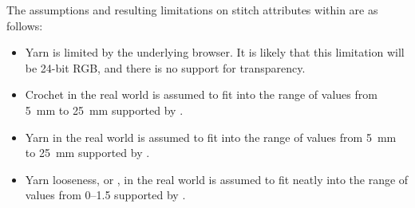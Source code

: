 \documentclass[main.tex]{subfiles}
\begin{document}
The assumptions and resulting limitations on stitch attributes within \CC{} are as follows:

\begin{itemize}
\item Yarn  is limited by the underlying browser. It is likely that this limitation will be 24-bit RGB, and there is no support for transparency.
\item Crochet  in the real world is assumed to fit into the range of values from \qty{5}{mm} to \qty{25}{mm} supported by \CC. 
\item Yarn  in the real world is assumed to fit into the range of values from \qty{5}{mm} to \qty{25}{mm} supported by \CC.
\item Yarn looseness, or , in the real world is assumed to fit neatly into the range of values from 0--1.5 supported by \CC.
\end{itemize}
\end{document}
